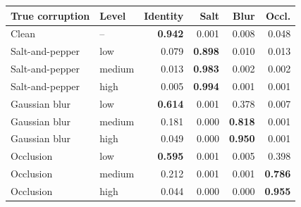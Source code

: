 \begin{tabular}{llrrrr}
\toprule
True corruption & Level & Identity & Salt & Blur & Occl. \\
\midrule
Clean & -- & \textbf{0.942} & 0.001 & 0.008 & 0.048 \\
Salt-and-pepper & low & 0.079 & \textbf{0.898} & 0.010 & 0.013 \\
Salt-and-pepper & medium & 0.013 & \textbf{0.983} & 0.002 & 0.002 \\
Salt-and-pepper & high & 0.005 & \textbf{0.994} & 0.001 & 0.001 \\
Gaussian blur & low & \textbf{0.614} & 0.001 & 0.378 & 0.007 \\
Gaussian blur & medium & 0.181 & 0.000 & \textbf{0.818} & 0.001 \\
Gaussian blur & high & 0.049 & 0.000 & \textbf{0.950} & 0.001 \\
Occlusion & low & \textbf{0.595} & 0.001 & 0.005 & 0.398 \\
Occlusion & medium & 0.212 & 0.001 & 0.001 & \textbf{0.786} \\
Occlusion & high & 0.044 & 0.000 & 0.000 & \textbf{0.955} \\
\bottomrule
\end{tabular}
